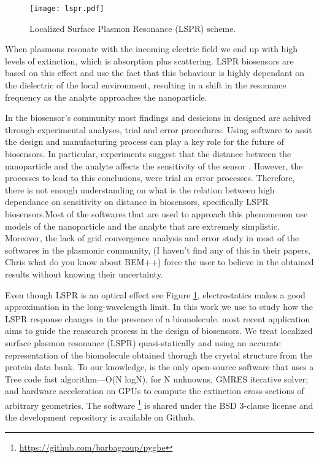 \begin{figure}[h] %
   \centering
   \texttt{[image: lspr.pdf]} 
   \caption{Localized Surface Plasmon Resonance (LSPR) scheme. }
   \label{fig:lspr}
\end{figure}

When plasmons resonate with the incoming electric field we end up with high 
levels of extinction, which is absorption plus scattering. LSPR biosensors are 
based on this effect and use the fact that this behaviour is highly dependant
on the dielectric of the local environment, resulting in a shift in the 
resonance frequency as the analyte approaches the nanoparticle.  


In the biosensor's community most findings and desicions in designed are achived 
through experimental analyses, trial and error procedures. Using software to 
assit the design and manufacturing process can play a key role for the future
of biosensors. In particular, experiments suggest that the distance between the
nanoparticle and the analyte affects the sensitivity of the sensor
\cite{HaesETal2004}. However, the processes to lead to this conclusions, were 
trial an error processes. Therefore, there is not enough understanding on what 
is the relation between high dependance on sensitivity on distance in 
biosensors, specifically LSPR biosensors.Most of the softwares that are used to 
approach this phenomenon use models of 
the nanoparticle and the analyte that are extremely simplistic. Moreover, the 
lack of grid convergence analysis and error study in most of the softwares in 
the plasmonic community, {\color{red}(I haven't find any of this in 
their papers, Chris what do you know about BEM++)} force the user to believe 
in the obtained results without knowing their uncertainty.


Even though LSPR is an optical effect see Figure \ref{fig:lspr}, electrostatics 
makes a good approximation in the long-wavelength limit. In this work we use
\pygbe to study how the LSPR response changes in the presence
of a biomolecule. \pygbe most recent application \cite{ClementiETal2017} aims 
to guide the reasearch process in the design of biosensors. We treat localized 
surface plasmon resonance (LSPR) quasi-statically \cite{MayergoyzZhang2007} and
using an accurate representation of the biomolecule obtained thorugh the 
crystal structure from the protein data bank. To our knowledge, \pygbe is the 
only open-source software that uses a Tree code fast algorithm—O(N logN), for 
N unknowns, GMRES iterative solver; and hardware acceleration on GPUs to compute
the extinction cross-sections of arbitrary geometries. The software
\footnote{\url{https://github.com/barbagroup/pygbe}} is shared under the 
BSD 3-clause license and the development repository is available on Github.

